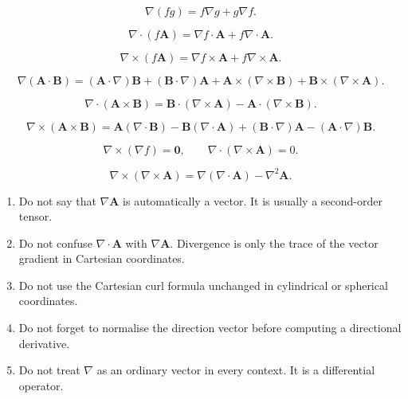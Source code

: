 \documentclass{otscience}
\begin{document}
\begin{formulabox}
    \[
        \nabla(fg)=f\nabla g+g\nabla f.
    \]

    \[
        \nabla\cdot(f\mathbf{A})=\nabla f\cdot\mathbf{A}+f\nabla\cdot\mathbf{A}.
    \]

    \[
        \nabla\times(f\mathbf{A})=\nabla f\times\mathbf{A}+f\nabla\times\mathbf{A}.
    \]

    \[
        \nabla(\mathbf{A}\cdot\mathbf{B})=(\mathbf{A}\cdot\nabla)\mathbf{B}+(\mathbf{B}\cdot\nabla)\mathbf{A}+\mathbf{A}\times(\nabla\times\mathbf{B})+\mathbf{B}\times(\nabla\times\mathbf{A}).
    \]

    \[
        \nabla\cdot(\mathbf{A}\times\mathbf{B})=\mathbf{B}\cdot(\nabla\times\mathbf{A})-\mathbf{A}\cdot(\nabla\times\mathbf{B}).
    \]

    \[
        \nabla\times(\mathbf{A}\times\mathbf{B})=\mathbf{A}(\nabla\cdot\mathbf{B})-\mathbf{B}(\nabla\cdot\mathbf{A})+(\mathbf{B}\cdot\nabla)\mathbf{A}-(\mathbf{A}\cdot\nabla)\mathbf{B}.
    \]

    \[
        \nabla\times(\nabla f)=\mathbf{0},\qquad \nabla\cdot(\nabla\times\mathbf{A})=0.
    \]

    \[
        \nabla\times(\nabla\times\mathbf{A})=\nabla(\nabla\cdot\mathbf{A})-\nabla^2\mathbf{A}.
    \]
\end{formulabox}

\begin{warningboxnosplit}
    \begin{enumerate}
        \item Do not say that \(\nabla\mathbf{A}\) is automatically a vector. It is usually a second-order tensor.
        \item Do not confuse \(\nabla\cdot\mathbf{A}\) with \(\nabla\mathbf{A}\). Divergence is only the trace of the vector gradient in Cartesian coordinates.
        \item Do not use the Cartesian curl formula unchanged in cylindrical or spherical coordinates.
        \item Do not forget to normalise the direction vector before computing a directional derivative.
        \item Do not treat \(\nabla\) as an ordinary vector in every context. It is a differential operator.
    \end{enumerate}
\end{warningboxnosplit}
\end{document}
